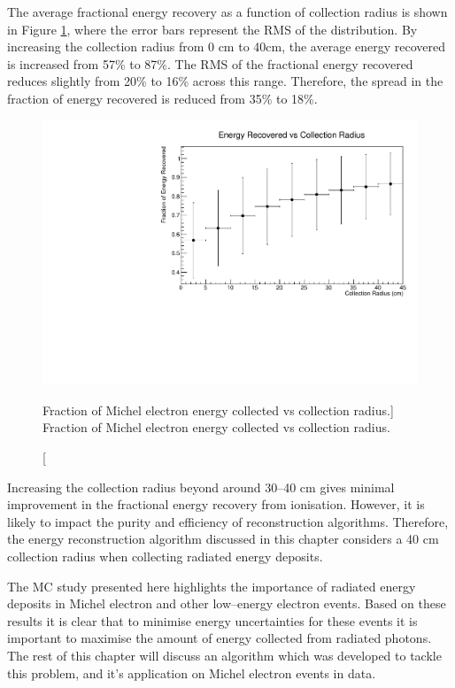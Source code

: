 The average fractional energy recovery as a function of collection radius is
shown in Figure \ref{fig:frac_v_radius}, where the error bars represent the RMS
of the distribution. By increasing the collection radius from 0 cm to 40cm, 
the average energy recovered is increased from 57\% to 87\%. The RMS of the
fractional energy recovered reduces slightly from 20\% to 16\% across this
range. Therefore, the spread in the fraction of energy recovered is reduced 
from 35\% to 18\%. 
\begin{figure}
	\centering
	\includegraphics[width=\textwidth]{figures/energy_recovery_v_radius.pdf}
	\caption
	[Fraction of Michel electron energy collected vs collection radius.]
	{Fraction of Michel electron energy collected vs collection radius.}
	\label{fig:frac_v_radius}
\end{figure}

Increasing the collection radius beyond around 30--40 cm gives minimal
improvement in the fractional energy recovery from ionisation. However, it is
likely to impact the purity and efficiency of reconstruction algorithms.
Therefore, the energy reconstruction algorithm discussed in this chapter
considers a 40 cm collection radius when collecting radiated energy deposits.

The MC study presented here highlights the importance of radiated energy
deposits in Michel electron and other low--energy electron events. Based on
these results it is clear that to minimise energy uncertainties for these events
it is important to maximise the amount of energy collected from radiated 
photons. The rest of this chapter will discuss an algorithm which was developed 
to tackle this problem, and it's application on Michel electron events in 
\protodune{} data.

